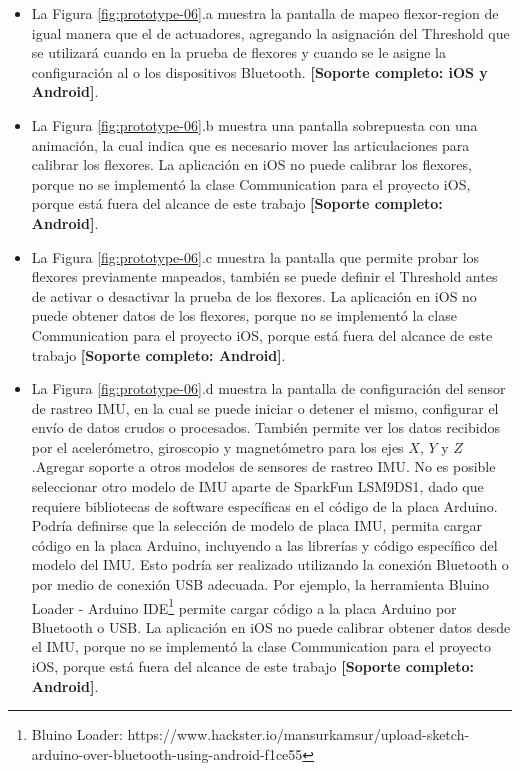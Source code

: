 \begin{itemize}

\item La Figura \ref{fig:prototype-06}.a muestra la pantalla de mapeo flexor-region de igual manera que el de actuadores, agregando la asignación del Threshold que se utilizará cuando en la prueba de flexores y cuando se le asigne la configuración al o los dispositivos Bluetooth. \textbf{[Soporte completo: iOS y Android]}.

\item La Figura \ref{fig:prototype-06}.b muestra una pantalla sobrepuesta con una animación, la cual indica que es necesario mover las articulaciones para calibrar los flexores. La aplicación en iOS no puede calibrar los flexores, porque no se implementó la clase Communication para el proyecto iOS, porque está fuera del alcance de este trabajo \textbf{[Soporte completo: Android]}.

\item La Figura \ref{fig:prototype-06}.c muestra la pantalla que permite probar los flexores previamente mapeados, también se puede definir el Threshold antes de activar o desactivar la prueba de los flexores. La aplicación en iOS no puede obtener datos de los flexores, porque no se implementó la clase Communication para el proyecto iOS, porque está fuera del alcance de este trabajo \textbf{[Soporte completo: Android]}.

\item La Figura \ref{fig:prototype-06}.d muestra la pantalla de configuración del sensor de rastreo IMU, en la cual se puede iniciar o detener el mismo, configurar el envío de datos crudos o procesados. También permite ver los datos recibidos por el acelerómetro, giroscopio y magnetómetro para los ejes $X$, $Y$ y $Z$.Agregar soporte a otros modelos de sensores de rastreo IMU. No es posible seleccionar otro modelo de IMU aparte de SparkFun LSM9DS1, dado que requiere bibliotecas de software específicas en el código de la placa Arduino. Podría definirse que la selección de modelo de placa IMU, permita cargar código en la placa Arduino, incluyendo a las librerías y código específico del modelo del IMU. Esto podría ser realizado utilizando la conexión Bluetooth o por medio de conexión USB adecuada. Por ejemplo, la herramienta Bluino Loader - Arduino IDE\footnote{Bluino Loader: https://www.hackster.io/mansurkamsur/upload-sketch-arduino-over-bluetooth-using-android-f1ce55} permite cargar código a la placa Arduino por Bluetooth o USB. La aplicación en iOS no puede calibrar obtener datos desde el IMU, porque no se implementó la clase Communication para el proyecto iOS, porque está fuera del alcance de este trabajo \textbf{[Soporte completo: Android]}.

\end{itemize}
